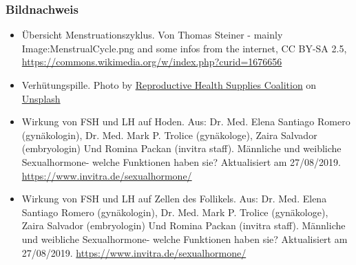 \documentclass{beamer}
\begin{document}
\begin{frame}
\frametitle{Bildnachweis}

\begin{tiny}


\begin{itemize}
\item
Übersicht Menstruationszyklus. Von Thomas Steiner - mainly Image:MenstrualCycle.png and some infos from the internet, CC BY-SA 2.5,\url{ https://commons.wikimedia.org/w/index.php?curid=1676656}

\item
Verhütungspille. Photo by \href{https://unsplash.com/@rhsupplies?utm_source=unsplash&utm_medium=referral&utm_content=creditCopyText}{Reproductive Health Supplies Coalition} on \href{https://unsplash.com/s/photos/contraceptive?utm_source=unsplash&utm_medium=referral&utm_content=creditCopyText}{Unsplash}

\item
Wirkung von FSH und LH auf Hoden. Aus:  Dr. Med. Elena Santiago Romero (gynäkologin), Dr. Med. Mark P. Trolice (gynäkologe), Zaira Salvador (embryologin) Und Romina Packan (invitra staff).  Männliche und weibliche Sexualhormone- welche Funktionen haben sie? Aktualisiert am 27/08/2019. \url{https://www.invitra.de/sexualhormone/}


\item
Wirkung von FSH und LH auf Zellen des Follikels. Aus:  Dr. Med. Elena Santiago Romero (gynäkologin), Dr. Med. Mark P. Trolice (gynäkologe), Zaira Salvador (embryologin) Und Romina Packan (invitra staff).  Männliche und weibliche Sexualhormone- welche Funktionen haben sie? Aktualisiert am 27/08/2019. \url{https://www.invitra.de/sexualhormone/}

\end{itemize}
\end{tiny}
\end{frame}
\end{document}
